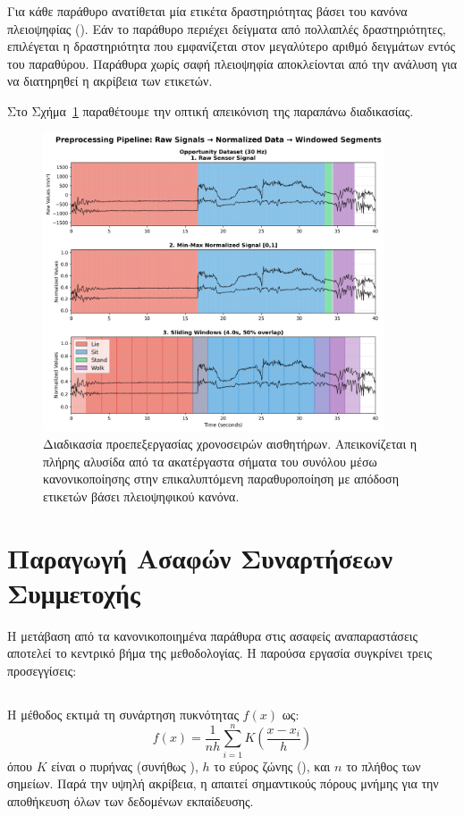 Για κάθε παράθυρο ανατίθεται μία ετικέτα δραστηριότητας βάσει του κανόνα πλειοψηφίας ().
Εάν το παράθυρο περιέχει δείγματα από πολλαπλές δραστηριότητες, επιλέγεται η δραστηριότητα που εμφανίζεται στον μεγαλύτερο αριθμό δειγμάτων εντός του παραθύρου.
Παράθυρα χωρίς σαφή πλειοψηφία αποκλείονται από την ανάλυση για να διατηρηθεί η ακρίβεια των ετικετών.

Στο Σχήμα~\ref{fig:preprocessing_pipeline} παραθέτουμε την οπτική απεικόνιση της παραπάνω διαδικασίας.

\begin{figure}[htbp]
    \centering
    \includegraphics[width=0.9\textwidth]{images/chapter4_preprocessing_pipeline_opportunity.png}
    \caption{Διαδικασία προεπεξεργασίας χρονοσειρών αισθητήρων. Απεικονίζεται η πλήρης αλυσίδα από τα ακατέργαστα σήματα του συνόλου  μέσω κανονικοποίησης  στην επικαλυπτόμενη παραθυροποίηση με απόδοση ετικετών βάσει πλειοψηφικού κανόνα.}
    \label{fig:preprocessing_pipeline}
\end{figure}

\section{Παραγωγή Ασαφών Συναρτήσεων Συμμετοχής}

Η μετάβαση από τα κανονικοποιημένα παράθυρα στις ασαφείς αναπαραστάσεις αποτελεί το κεντρικό βήμα της μεθοδολογίας.
Η παρούσα εργασία συγκρίνει τρεις προσεγγίσεις:

\subsection{}
Η  μέθοδος  εκτιμά τη συνάρτηση πυκνότητας $f(x)$ ως:
\[
f(x) = \frac{1}{nh} \sum_{i=1}^{n} K\left(\frac{x - x_i}{h}\right)
\]
όπου $K$ είναι ο πυρήνας (συνήθως ), $h$ το εύρος ζώνης (), και $n$ το πλήθος των σημείων. Παρά την υψηλή ακρίβεια, η  απαιτεί σημαντικούς πόρους μνήμης για την αποθήκευση όλων των δεδομένων εκπαίδευσης.

